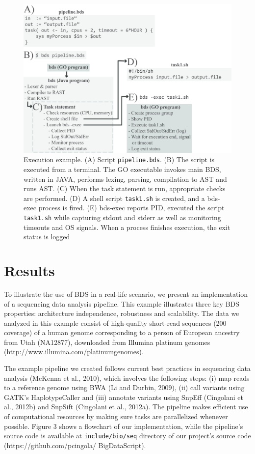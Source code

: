 \begin{figure}
    \centering
    \includegraphics[width=12cm]{bds_figure_1_small.png}
    \caption{Execution example. (A) Script \texttt{pipeline.bds}. (B) The script is executed from a terminal. The GO executable invokes main BDS, written in JAVA, performs lexing, parsing, compilation to AST and runs AST. (C) When the task statement is run, appropriate checks are performed. (D) A shell script \texttt{task1.sh} is created, and a bds-exec process is fired. (E) bds-exec reports PID, executed the script \texttt{task1.sh} while capturing stdout and stderr as well as monitoring timeouts and OS signals. When a process finishes execution, the exit status is logged}
    \label{fig:bdsexec}
\end{figure}

\section{Results}

To illustrate the use of BDS in a real-life scenario, we present an implementation of a sequencing data analysis pipeline. This example illustrates three key BDS properties: architecture independence, robustness and scalability. The data we analyzed in this example consist of high-quality short-read sequences (200 coverage) of a human genome corresponding to a person of European ancestry from Utah (NA12877), downloaded from Illumina platinum genomes (http://www.illumina.com/platinumgenomes).

The example pipeline we created follows current best practices in sequencing data analysis (McKenna et al., 2010), which involves the following steps: (i) map reads to a reference genome using BWA (Li and Durbin, 2009), (ii) call variants using GATK’s HaplotypeCaller and (iii) annotate variants using SnpEff (Cingolani et al., 2012b) and SnpSift (Cingolani et al., 2012a). The pipeline makes efficient use of computational resources by making sure tasks are parallelized whenever possible. Figure 3 shows a flowchart of our implementation, while the pipeline’s source code is available at \texttt{include/bio/seq} directory of our project’s source code (https://github.com/pcingola/ BigDataScript).

